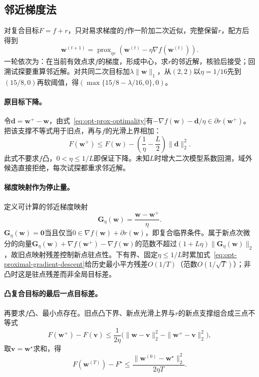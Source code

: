 \subsection{邻近梯度法}

对复合目标$F=f+r$，只对易求梯度的$f$作一阶加二次近似，完整保留$r$，配方后得到
\begin{equation}
 \bm w^{(t+1)}
 =\operatorname{prox}_{\eta r}\!\left(
 \bm w^{(t)}-\eta\nabla f(\bm w^{(t)})\right).
 \label{eq:opt-proximal-gradient-update}
\end{equation}
一轮依次为：在当前有效点求$f$的梯度，形成中心，求$r$的邻近解，核验后接受；回溯试探要重算邻近解。对共同二次目标加$\lambda\|\bm w\|_1$，从$(2,2)$以$\eta=1/16$先到$(15/8,0)$再软阈值，得$(\max\{15/8-\lambda/16,0\},0)$。

\paragraph{原目标下降。}
令$\bm d=\bm w^+-\bm w$，由式~\eqref{eq:opt-prox-optimality}有$-\nabla f(\bm w)-\bm d/\eta\in\partial r(\bm w^+)$。把该支撑不等式用于旧点，再与$f$的光滑上界相加：
\begin{equation}
 F(\bm w^+)\leq F(\bm w)
 -\left(\frac1\eta-\frac L2\right)\|\bm d\|_2^2.
 \label{eq:opt-proximal-gradient-descent}
\end{equation}
此式不要求$f$凸，$0<\eta\leq1/L$即保证下降。未知$L$时增大二次模型系数回溯，域外候选直接拒绝，每次试探都重求邻近解。

\paragraph{梯度映射作为停止量。}
定义可计算的邻近梯度映射
\[
 \bm G_\eta(\bm w)=\frac{\bm w-\bm w^+}{\eta}.
\]
$\bm G_\eta(\bm w)=\bm0$当且仅当$0\in\nabla f(\bm w)+\partial r(\bm w)$，即复合临界条件。属于新点次微分的向量$\bm G_\eta(\bm w)+\nabla f(\bm w^+)-\nabla f(\bm w)$的范数不超过$(1+L\eta)\|\bm G_\eta(\bm w)\|_2$，故旧点映射残差控制新点驻点性。下有界、固定$\eta\leq1/L$时累加式~\eqref{eq:opt-proximal-gradient-descent}给历史最小平方残差$O(1/T)$（范数$O(1/\sqrt T)$）；非凸时这是驻点残差而非全局目标差。

\paragraph{凸复合目标的最后一点目标差。}
再要求$f$凸、最小点存在。旧点凸下界、新点光滑上界与$r$的新点支撑组合成三点不等式
\[
 F(\bm w^+)-F(\bm v)
 \leq\frac{1}{2\eta}\bigl(
 \|\bm w-\bm v\|_2^2-\|\bm w^+-\bm v\|_2^2
 \bigr),
\]
取$\bm v=\bm w^\star$求和，得
\[
 F(\bm w^{(T)})-F^\star
 \leq\frac{\|\bm w^{(0)}-\bm w^\star\|_2^2}{2\eta T}.
\]

